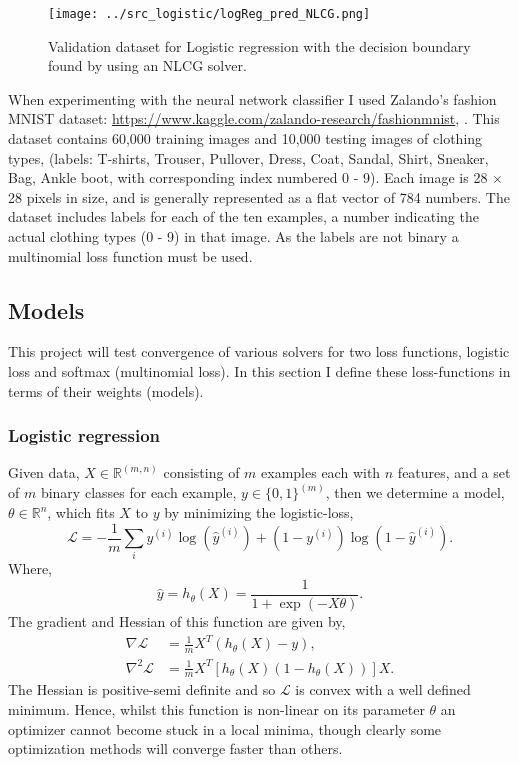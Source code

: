 \documentclass[11pt,twocolumn]{article}
\begin{document}
\begin{figure}[!ht]
\centering
\texttt{[image: ../src\_logistic/logReg\_pred\_NLCG.png]}
\caption{Validation dataset for Logistic regression with the decision boundary found by using an NLCG solver.}\label{valid_dataset}
\end{figure}

When experimenting with the neural network classifier I used Zalando's fashion MNIST dataset: \url{https://www.kaggle.com/zalando-research/fashionmnist}, \cite{FashionMNIST:data}. This dataset contains 60,000 training images and 10,000 testing images of clothing types, (labels: T-shirts, Trouser, Pullover, Dress, Coat, Sandal, Shirt, Sneaker, Bag, Ankle boot, with corresponding index numbered 0 - 9). Each image is 28 $\times$ 28 pixels in size, and is generally represented as a flat vector of 784 numbers. The dataset includes labels for each of the ten examples, a number indicating the actual clothing types (0 - 9) in that image. As the labels are not binary a multinomial loss function must be used.

\subsection{Models}   
This project will test convergence of various solvers for two loss functions, logistic loss and softmax (multinomial loss). In this section I define these loss-functions in terms of their weights (models).

\subsubsection*{Logistic regression}
Given data, $X \in \mathbb{R}^{(m,n)}$ consisting of $m$ examples each with $n$ features, and a set of $m$ binary classes for each example, $y\in \{0,1\}^{(m)}$, then we determine a model, $\theta \in \mathbb{R}^n$, which fits $X$ to $y$ by minimizing the logistic-loss, 
\begin{equation}
\mathcal{L}=-\frac{1}{m}\sum_{i}y^{(i)}\log{(\widehat{y}^{(i)})}+(1-y^{(i)})\log{(1-\widehat{y}^{(i)})}.\label{logistic_func}
\end{equation}
Where,
\begin{equation}
\widehat{y}=h_{\theta}(X)=\frac{1}{1+\exp(-X \theta)}.
\end{equation}
The gradient and Hessian of this function are given by,
\begin{align}
\nabla \mathcal{L}&=\frac{1}{m}X^{T}(h_{\theta}(X)-y),\\
\nabla^2 \mathcal{L}&=\frac{1}{m}X^{T}[h_{\theta}(X)(1-h_{\theta}(X))]X.
\end{align}
The Hessian is positive-semi definite and so $\mathcal{L}$ is convex with a well defined minimum. Hence, whilst this function is non-linear on its parameter $\theta$ an optimizer cannot become stuck in a local minima, though clearly some optimization methods will converge faster than others.
\end{document}
